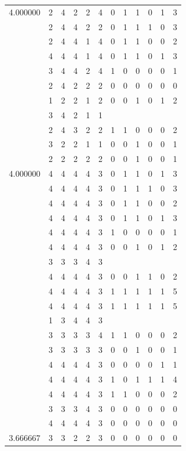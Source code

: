 \documentclass[]{book}
\theoremstyle{definition}
\theoremstyle{definition}
\theoremstyle{definition}
\theoremstyle{remark}
\begin{document}
\begin{table}
{\begin{tabular}[t]{rrrrrrrrrrrr}
4.000000 & 2 & 4 & 2 & 2 & 4 & 0 & 1 & 1 & 0 & 1 & 3\\
 & 2 & 4 & 4 & 2 & 2 & 0 & 1 & 1 & 1 & 0 & 3\\
 & 2 & 4 & 4 & 1 & 4 & 0 & 1 & 1 & 0 & 0 & 2\\
 & 4 & 4 & 4 & 1 & 4 & 0 & 1 & 1 & 0 & 1 & 3\\
 & 3 & 4 & 4 & 2 & 4 & 1 & 0 & 0 & 0 & 0 & 1\\
 & 2 & 4 & 2 & 2 & 2 & 0 & 0 & 0 & 0 & 0 & 0\\
 & 1 & 2 & 2 & 1 & 2 & 0 & 0 & 1 & 0 & 1 & 2\\
 & 3 & 4 & 2 & 1 & 1 &  &  &  &  &  & \\
 & 2 & 4 & 3 & 2 & 2 & 1 & 1 & 0 & 0 & 0 & 2\\
 & 3 & 2 & 2 & 1 & 1 & 0 & 0 & 1 & 0 & 0 & 1\\
 & 2 & 2 & 2 & 2 & 2 & 0 & 0 & 1 & 0 & 0 & 1\\
4.000000 & 4 & 4 & 4 & 4 & 3 & 0 & 1 & 1 & 0 & 1 & 3\\
 & 4 & 4 & 4 & 4 & 3 & 0 & 1 & 1 & 1 & 0 & 3\\
 & 4 & 4 & 4 & 4 & 3 & 0 & 1 & 1 & 0 & 0 & 2\\
 & 4 & 4 & 4 & 4 & 3 & 0 & 1 & 1 & 0 & 1 & 3\\
 & 4 & 4 & 4 & 4 & 3 & 1 & 0 & 0 & 0 & 0 & 1\\
 & 4 & 4 & 4 & 4 & 3 & 0 & 0 & 1 & 0 & 1 & 2\\
 & 3 & 3 & 3 & 4 & 3 &  &  &  &  &  & \\
 & 4 & 4 & 4 & 4 & 3 & 0 & 0 & 1 & 1 & 0 & 2\\
 & 4 & 4 & 4 & 4 & 3 & 1 & 1 & 1 & 1 & 1 & 5\\
 & 4 & 4 & 4 & 4 & 3 & 1 & 1 & 1 & 1 & 1 & 5\\
 & 1 & 3 & 4 & 4 & 3 &  &  &  &  &  & \\
 & 3 & 3 & 3 & 3 & 4 & 1 & 1 & 0 & 0 & 0 & 2\\
 & 3 & 3 & 3 & 3 & 3 & 0 & 0 & 1 & 0 & 0 & 1\\
 & 4 & 4 & 4 & 4 & 3 & 0 & 0 & 0 & 0 & 1 & 1\\
 & 4 & 4 & 4 & 4 & 3 & 1 & 0 & 1 & 1 & 1 & 4\\
 & 4 & 4 & 4 & 4 & 3 & 1 & 1 & 0 & 0 & 0 & 2\\
 & 3 & 3 & 3 & 4 & 3 & 0 & 0 & 0 & 0 & 0 & 0\\
 & 4 & 4 & 4 & 4 & 3 & 0 & 0 & 0 & 0 & 0 & 0\\
3.666667 & 3 & 3 & 2 & 2 & 3 & 0 & 0 & 0 & 0 & 0 & 0\\

\end{tabular}}
\end{table}
\end{document}

